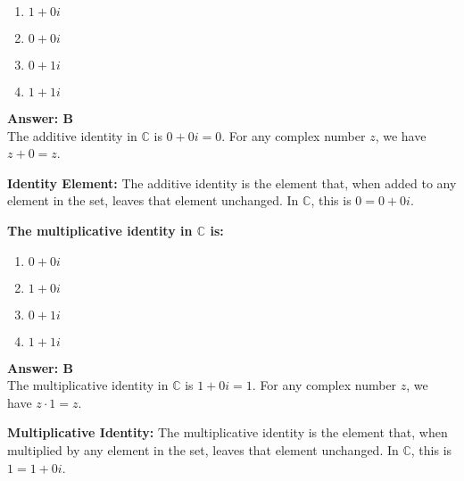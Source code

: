 \documentclass[12pt,a4paper]{article}
\begin{document}
\begin{partbox}[Options]
\begin{enumerate}[label=\Alph*.]
    \item \( 1 + 0i \)
    \item \( 0 + 0i \)
    \item \( 0 + 1i \)
    \item \( 1 + 1i \)
\end{enumerate}
\end{partbox}

\begin{answerstyle}
\textbf{Answer: B} \\
The additive identity in \( \mathbb{C} \) is \( 0 + 0i = 0 \). For any complex number \( z \), we have \( z + 0 = z \).
\end{answerstyle}

\begin{conceptbox}
\textbf{Identity Element:} The additive identity is the element that, when added to any element in the set, leaves that element unchanged. In \( \mathbb{C} \), this is \( 0 = 0 + 0i \).
\end{conceptbox}

\newpage
\begin{questiontitle}[MCQ 58]
\textbf{The multiplicative identity in \( \mathbb{C} \) is:}
\end{questiontitle}

\begin{partbox}[Options]
\begin{enumerate}[label=\Alph*.]
    \item \( 0 + 0i \)
    \item \( 1 + 0i \)
    \item \( 0 + 1i \)
    \item \( 1 + 1i \)
\end{enumerate}
\end{partbox}

\begin{answerstyle}
\textbf{Answer: B} \\
The multiplicative identity in \( \mathbb{C} \) is \( 1 + 0i = 1 \). For any complex number \( z \), we have \( z \cdot 1 = z \).
\end{answerstyle}

\begin{conceptbox}
\textbf{Multiplicative Identity:} The multiplicative identity is the element that, when multiplied by any element in the set, leaves that element unchanged. In \( \mathbb{C} \), this is \( 1 = 1 + 0i \).
\end{conceptbox}
\end{document}
